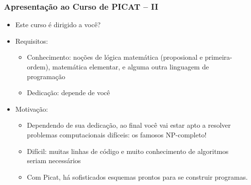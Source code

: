 \begin{frame}[fragile]
  \frametitle{Apresentação ao Curso de PICAT -- II}
  \begin{itemize}

    \item Este curso é dirigido a você?
  \pause
    \item Requisitos:
   \pause
		\begin{itemize}
			\item Conhecimento: noções de lógica matemática 
			(proposional e primeira-ordem), matemática elementar, 
			e alguma outra linguagem de programação

			\item Dedicação: depende de você
		\end{itemize}
		
  \pause
    \item Motivação:
   \pause
		\begin{itemize}
			\item Dependendo de sua dedicação, ao final você vai estar apto a resolver problemas
			computacionais difíceis: os famosos NP-completo!
			
			\item Difícil: muitas linhas de código e muito conhecimento de algoritmos seriam
			necessários
			
			\item Com Picat, há sofisticados esquemas prontos para se construir programas.

		\end{itemize}

  \end{itemize}

\end{frame}


